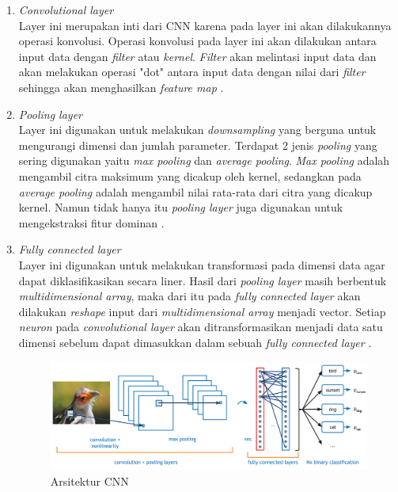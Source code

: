 \begin{enumerate}
  \item \textit{Convolutional layer} \\
  Layer ini merupakan inti dari CNN karena pada layer ini akan dilakukannya operasi konvolusi. Operasi konvolusi pada layer ini akan dilakukan antara input data dengan \textit{filter} atau \textit{kernel}. \textit{Filter} akan melintasi input data dan akan melakukan operasi "dot" antara input data dengan nilai dari \textit{filter} sehingga akan menghasilkan \textit{feature map} \parencite{LinaQ}.
  
  \item \textit{Pooling layer} \\
  Layer ini digunakan untuk melakukan \textit{downsampling} yang berguna untuk mengurangi dimensi dan jumlah parameter. Terdapat 2 jenis \textit{pooling} yang sering digunakan yaitu \textit{max pooling} dan  \textit{average pooling}. \textit{Max pooling} adalah mengambil citra maksimum yang dicakup oleh kernel, sedangkan pada \textit{average pooling} adalah mengambil nilai rata-rata dari citra yang dicakup kernel.
  Namun tidak hanya itu \textit{pooling layer} juga digunakan untuk mengekstraksi fitur dominan \Parencite{Bukusakti}. 

  \item \textit{Fully connected layer} \\
  Layer ini digunakan untuk melakukan transformasi pada dimensi data agar dapat diklasifikasikan secara liner.
  Hasil dari \textit{pooling layer} masih berbentuk \textit{multidimensional array}, maka dari itu pada \textit{fully connected layer} akan dilakukan \textit{reshape} input dari \textit{multidimensional array} menjadi vector. Setiap \textit{neuron} pada \textit{convolutional layer} akan ditransformasikan menjadi data satu dimensi sebelum dapat dimasukkan dalam sebuah \textit{fully connected layer} \parencite{JurnalTeknikITS}.

  \begin{figure}[!h]
    \centering
    \includegraphics[width=1\linewidth]{gambar/cnn.png}
    \caption{Arsitektur CNN \parencite{adit}}
    \label{fig:cnn}
  \end{figure}

\end{enumerate} 

